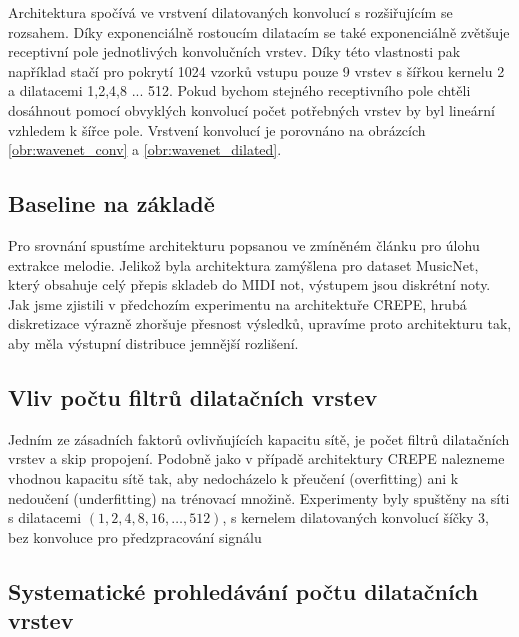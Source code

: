 Architektura spočívá ve vrstvení dilatovaných konvolucí s rozšiřujícím se rozsahem. Díky exponenciálně rostoucím dilatacím se také exponenciálně zvětšuje receptivní pole jednotlivých konvolučních vrstev. Díky této vlastnosti pak například stačí pro pokrytí 1024 vzorků vstupu pouze 9 vrstev s šířkou kernelu 2 a dilatacemi 1,2,4,8 ... 512. Pokud bychom stejného receptivního pole chtěli dosáhnout pomocí obvyklých konvolucí počet potřebných vrstev by byl lineární vzhledem k šířce pole. Vrstvení konvolucí je porovnáno na obrázcích \ref{obr:wavenet_conv} a \ref{obr:wavenet_dilated}.


\subsection{Baseline na základě \cite{Martak2018}}

Pro srovnání spustíme architekturu popsanou ve zmíněném článku pro úlohu extrakce melodie. Jelikož byla architektura zamýšlena pro dataset MusicNet, který obsahuje celý přepis skladeb do MIDI not, výstupem jsou diskrétní noty. Jak jsme zjistili v předchozím experimentu na architektuře CREPE, hrubá diskretizace výrazně zhoršuje přesnost výsledků, upravíme proto architekturu tak, aby měla výstupní distribuce jemnější rozlišení.

\subsection{Vliv počtu filtrů dilatačních vrstev}

Jedním ze zásadních faktorů ovlivňujících kapacitu sítě, je počet filtrů dilatačních vrstev a skip propojení. Podobně jako v případě architektury CREPE nalezneme vhodnou kapacitu sítě tak, aby nedocházelo k přeučení (overfitting) ani k nedoučení (underfitting) na trénovací množině.
Experimenty byly spuštěny na síti s dilatacemi $(1,2,4,8,16,\dots,512)$, s kernelem dilatovaných konvolucí šíčky 3, bez konvoluce pro předzpracování signálu



\subsection{Systematické prohledávání počtu dilatačních vrstev}

